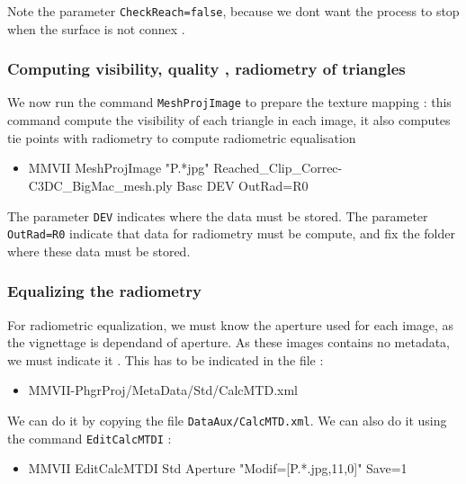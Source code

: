 Note the parameter {\tt CheckReach=false}, because we dont want the process to stop when 
the surface is not connex .


\subsubsection{Computing visibility, quality , radiometry of triangles}

We now run the command  {\tt MeshProjImage} to prepare the texture mapping : this command
compute the visibility of each triangle in each image, it also computes tie points with 
radiometry to compute radiometric equalisation 

\begin{itemize}
    \item {MMVII MeshProjImage "P.*jpg"  Reached\_Clip\_Correc-C3DC\_BigMac\_mesh.ply Basc DEV OutRad=R0}
\end{itemize}

The parameter {\tt DEV} indicates where the data must be stored.
The parameter {\tt OutRad=R0} indicate that data for radiometry 
must be compute, and fix the folder where these data must be stored.


\subsubsection{Equalizing the radiometry}

For radiometric equalization, we must know the aperture used for each image,
as the vignettage is dependand of aperture. As these images contains no metadata,
we must indicate it . This has to be indicated in the file :

\begin{itemize}
    \item {MMVII-PhgrProj/MetaData/Std/CalcMTD.xml}
\end{itemize}

We can do it by copying the file {\tt DataAux/CalcMTD.xml}. We can also
do it using the command {\tt EditCalcMTDI} :

\begin{itemize}
      \item {MMVII  EditCalcMTDI Std Aperture "Modif=[P.*.jpg,11,0]"  Save=1}
\end{itemize}

